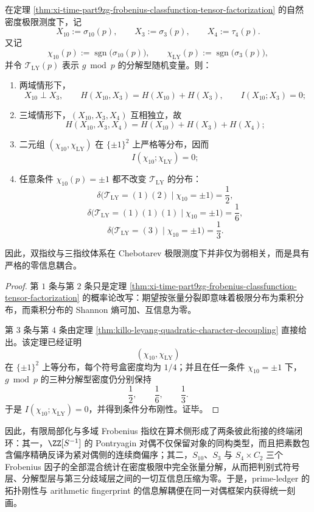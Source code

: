 \begin{corollary}[算术指纹的零互信息律]\label{cor:xi-time-part9zg-arithmetic-fingerprint-zero-mutual-information}
在定理 \ref{thm:xi-time-part9zg-frobenius-classfunction-tensor-factorization} 的自然密度极限测度下，记
\[
X_{10}:=\sigma_{10}(p),\qquad
X_3:=\sigma_3(p),\qquad
X_4:=\tau_4(p).
\]
又记
\[
\chi_{10}(p):=\operatorname{sgn}\!\bigl(\sigma_{10}(p)\bigr),
\qquad
\chi_{\mathrm{LY}}(p):=\operatorname{sgn}\!\bigl(\sigma_3(p)\bigr),
\]
并令 \(\mathcal T_{\mathrm{LY}}(p)\) 表示 \(g\bmod p\) 的分解型随机变量。则：
\begin{enumerate}
  \item 两域情形下，
  \[
  X_{10}\perp X_3,
  \qquad
  H(X_{10},X_3)=H(X_{10})+H(X_3),
  \qquad
  I(X_{10};X_3)=0;
  \]
  \item 三域情形下，\((X_{10},X_3,X_4)\) 互相独立，故
  \[
  H(X_{10},X_3,X_4)=H(X_{10})+H(X_3)+H(X_4);
  \]
  \item 二元组 \((\chi_{10},\chi_{\mathrm{LY}})\) 在 \(\{\pm1\}^2\) 上严格等分布，因而
  \[
  I(\chi_{10};\chi_{\mathrm{LY}})=0;
  \]
  \item 任意条件 \(\chi_{10}(p)=\pm1\) 都不改变 \(\mathcal T_{\mathrm{LY}}\) 的分布：
  \[
  \delta\!\bigl(\mathcal T_{\mathrm{LY}}=(1)(2)\mid \chi_{10}=\pm1\bigr)=\frac12,
  \]
  \[
  \delta\!\bigl(\mathcal T_{\mathrm{LY}}=(1)(1)(1)\mid \chi_{10}=\pm1\bigr)=\frac16,
  \]
  \[
  \delta\!\bigl(\mathcal T_{\mathrm{LY}}=(3)\mid \chi_{10}=\pm1\bigr)=\frac13.
  \]
\end{enumerate}
因此，双指纹与三指纹体系在 Chebotarev 极限测度下并非仅为弱相关，而是具有严格的零信息耦合。
\end{corollary}
\begin{proof}
第 \(1\) 条与第 \(2\) 条只是定理 \ref{thm:xi-time-part9zg-frobenius-classfunction-tensor-factorization} 的概率论改写：期望按张量分裂即意味着极限分布为乘积分布，而乘积分布的 Shannon 熵可加、互信息为零。

第 \(3\) 条与第 \(4\) 条由定理 \ref{thm:killo-leyang-quadratic-character-decoupling} 直接给出。该定理已经证明
\[
(\chi_{10},\chi_{\mathrm{LY}})
\]
在 \(\{\pm1\}^2\) 上等分布，每个符号盒密度均为 \(1/4\)；并且在任一条件 \(\chi_{10}=\pm1\) 下，\(g\bmod p\) 的三种分解型密度仍分别保持
\[
\frac12,\qquad \frac16,\qquad \frac13.
\]
于是 \(I(\chi_{10};\chi_{\mathrm{LY}})=0\)，并得到条件分布刚性。证毕。
\end{proof}

\noindent
因此，有限局部化与多域 Frobenius 指纹在算术侧形成了两条彼此衔接的终端闭环：其一，\(\ZZ[S^{-1}]\) 的 Pontryagin 对偶不仅保留对象的同构类型，而且把素数包含偏序精确反译为紧对偶侧的连续商偏序；其二，\(S_{10}\)、\(S_3\) 与 \(S_4\times C_2\) 三个 Frobenius 因子的全部混合统计在密度极限中完全张量分解，从而把判别式符号层、分解型层与第三分歧域层之间的一切互信息压缩为零。于是，prime-ledger 的拓扑刚性与 arithmetic fingerprint 的信息解耦便在同一对偶框架内获得统一刻画。

\endinput
